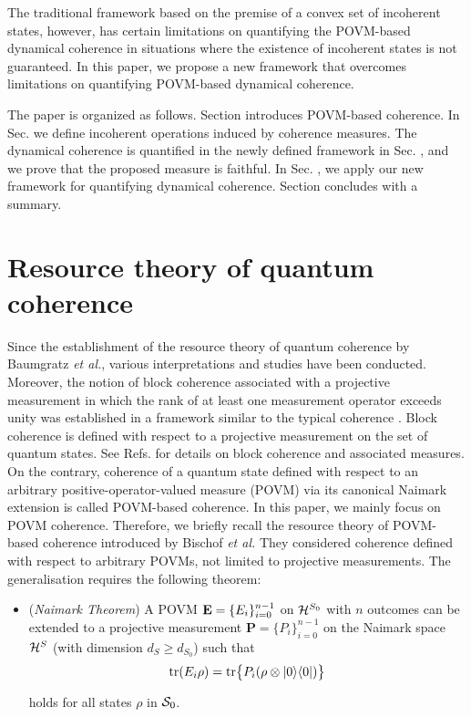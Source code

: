 \documentclass[american,aps,pra,reprint, superscriptaddress]{revtex4-1}
\def\bea{\begin{eqnarray*}}
\def\eea{\end{eqnarray*}}
\def\ot{\otimes}
\theoremstyle{plain}
\newcommand{\out}[2]{| #1\rangle\langle #2 |}
\DeclareMathOperator{\trace}{tr}
\newcommand{\ptr}[2]{\trace_{#1}({#2})}
\newcommand{\tr}[1]{\ptr{}{#1}}
\def\bP{\mathbf{P}}\def\bQ{\mathbf{Q}}\def\bR{\mathbf{R}}\def\bS{\mathbf{S}}\def\bT{\mathbf{T}}
\theoremstyle{definition}
\theoremstyle{remark}
\begin{document}
The traditional framework based on the premise of a convex set of incoherent states, however, has certain limitations on quantifying the POVM-based dynamical coherence in situations where the existence of incoherent states is not guaranteed.
In this paper, we propose a new framework that overcomes limitations on quantifying POVM-based dynamical coherence.

The paper is organized as follows. Section \uppercase\expandafter{} introduces POVM-based coherence. In Sec. \uppercase\expandafter{} we define incoherent operations induced by coherence measures.
The dynamical coherence is quantified in the newly defined framework in Sec. \uppercase\expandafter{}, and we prove that the proposed measure is faithful. In Sec. \uppercase\expandafter{}, we apply our new framework for quantifying dynamical coherence.
Section \uppercase\expandafter{} concludes with a summary.



\section{Resource theory of quantum coherence}

Since the establishment of the resource theory of quantum coherence by Baumgratz {\it et al.}, various interpretations and studies have been conducted. Moreover, the notion of block coherence associated with a projective measurement in which the rank of at least one measurement operator exceeds unity was established in a framework similar to the typical coherence \cite{Baumgratz, Aberg, Bischof1, Bischof2}. 
%
Block coherence is defined with respect to a projective measurement on the set of quantum states. See Refs. \cite{Aberg, Bischof1} for details on block coherence and associated measures. On the contrary, coherence of a quantum state defined with respect to an arbitrary positive-operator-valued measure (POVM) via its canonical Naimark extension is called POVM-based coherence.
%
In this paper, we mainly focus on POVM coherence.
Therefore, we briefly recall the resource theory of POVM-based coherence introduced by Bischof \emph{et al.} %
%
They considered coherence defined with respect to arbitrary POVMs, not limited to projective measurements.
The generalisation requires the following theorem:
\begin{itemize}
  \item (\emph{Naimark Theorem}) A POVM $\mathbf{E} = \{E_i\}_{i=0}^{n-1}$ on $\mathcal{H}^{S_0}$ with $n$ outcomes can be extended to a projective measurement $\bP = \{P_i\}_{i=0}^{n-1}$ on the Naimark space $\mathcal{H}^{S}$ (with dimension $d_{S}\geq d_{S_0}$) such that
\bea
\tr{E_i\rho} = \textmd{tr}\big\{P_i(\rho\ot\out{0}{0})\big\}
\eea
holds for all states $\rho$ in $\mathcal{S}_0$.
\end{itemize}
\end{document}
